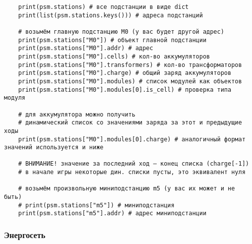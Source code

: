 \begin{verbatim}
    print(psm.stations) # все подстанции в виде dict 
    print(list(psm.stations.keys())) # адреса подстанций 

    # возьмём главную подстанцию М0 (у вас будет другой адрес) 
    print(psm.stations["M0"]) # объект главной подстанции 
    print(psm.stations["M0"].addr) # адрес 
    print(psm.stations["M0"].cells) # кол-во аккумуляторов 
    print(psm.stations["M0"].transformers) # кол-во трансформаторов 
    print(psm.stations["M0"].charge) # общий заряд аккумуляторов 
    print(psm.stations["M0"].modules) # список модулей как объектов 
    print(psm.stations["M0"].modules[0].is_cell) # проверка типа модуля 

    # для аккумулятора можно получить 
    # динамический список со значениями заряда за этот и предыдущие ходы 
    print(psm.stations["M0"].modules[0].charge) # аналогичный формат значений используется и ниже 

    # ВНИМАНИЕ! значение за последний ход — конец списка (charge[-1]) 
    # в начале игры некоторые дин. списки пусты, это эквивалент нуля 

    # возьмём произвольную миниподстанцию m5 (у вас их может и не быть) 
    # print(psm.stations["m5"]) # миниподстанция 
    print(psm.stations["m5"].addr) # адрес миниподстанции 
\end{verbatim}

\subsubsection*{Энергосеть}

